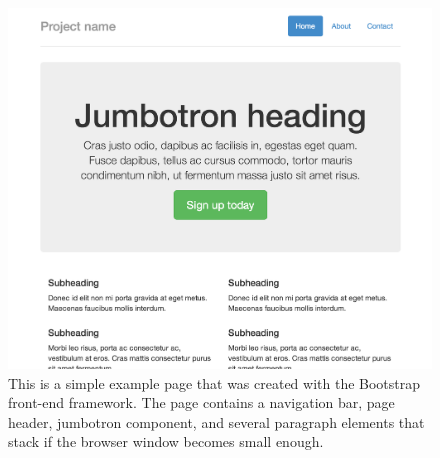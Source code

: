 \begin{figure}
\begin{center}
\includegraphics[height=\textheight,width=5in,keepaspectratio]{figures/bootstrap.png}
\caption[Bootstrap Web Page \cite{bootstrap2014}]{This is a simple example page that was created with the Bootstrap front-end framework. The page contains a navigation bar, page header, jumbotron component, and several paragraph elements that stack if the browser window becomes small enough\cite{bootstrap2014}.\label{fig:bootstrap_web_page}}
\end{center}
\end{figure}

